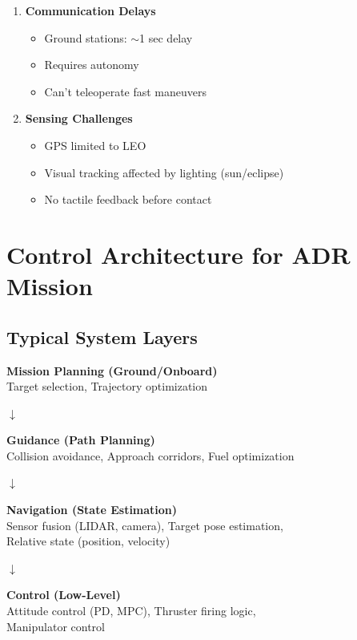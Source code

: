 \documentclass[11pt,a4paper]{article}
\begin{document}
\begin{enumerate}
    \item \textbf{Communication Delays}
    \begin{itemize}
        \item Ground stations: $\sim$1 sec delay
        \item Requires autonomy
        \item Can't teleoperate fast maneuvers
    \end{itemize}

    \item \textbf{Sensing Challenges}
    \begin{itemize}
        \item GPS limited to LEO
        \item Visual tracking affected by lighting (sun/eclipse)
        \item No tactile feedback before contact
    \end{itemize}
\end{enumerate}

\section{Control Architecture for ADR Mission}

\subsection{Typical System Layers}

\begin{center}
\begin{minipage}{0.8\textwidth}
\begin{tcolorbox}[colback=blue!5!white,colframe=codeborder]
\centering
\textbf{Mission Planning (Ground/Onboard)} \\
Target selection, Trajectory optimization

\vspace{0.3cm}
$\downarrow$

\vspace{0.3cm}
\textbf{Guidance (Path Planning)} \\
Collision avoidance, Approach corridors, Fuel optimization

\vspace{0.3cm}
$\downarrow$

\vspace{0.3cm}
\textbf{Navigation (State Estimation)} \\
Sensor fusion (LIDAR, camera), Target pose estimation, \\
Relative state (position, velocity)

\vspace{0.3cm}
$\downarrow$

\vspace{0.3cm}
\textbf{Control (Low-Level)} \\
Attitude control (PD, MPC), Thruster firing logic, \\
Manipulator control
\end{tcolorbox}
\end{minipage}
\end{center}
\end{document}
